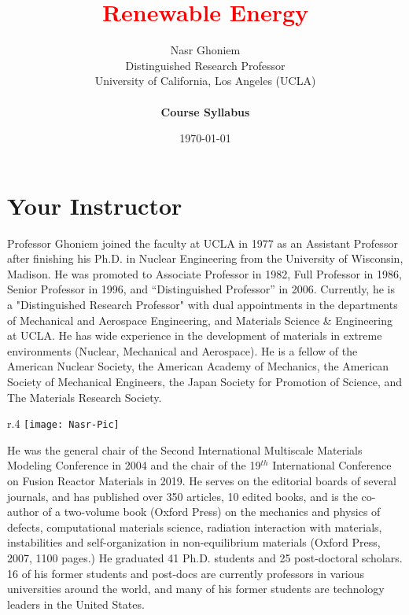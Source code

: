 \documentclass[11pt]{article}
\title{{\Huge\textcolor{red}{Renewable Energy}}}
\author{Nasr Ghoniem\\Distinguished Research Professor\\University of California, Los Angeles (UCLA)\\~ \\\textbf{Course Syllabus}}
\date{\today}
\begin{document}
\maketitle
\tableofcontents
\newpage
\section{Your Instructor}
Professor Ghoniem joined the faculty at UCLA in 1977 as an Assistant Professor after finishing his
Ph.D. in Nuclear Engineering from the University of Wisconsin, Madison. He was promoted to
Associate Professor in 1982, Full Professor in 1986, Senior Professor in 1996, and “Distinguished
Professor” in 2006. Currently, he is a "Distinguished Research Professor" with dual appointments in the departments of Mechanical and Aerospace Engineering, and Materials Science \& Engineering at UCLA. He has wide experience in the development of materials in extreme environments (Nuclear, Mechanical and Aerospace). He is a fellow of the American Nuclear Society, the American Academy of Mechanics, the American Society of Mechanical Engineers, the Japan Society for Promotion of Science, and The Materials Research Society.
\begin{wrapfigure}{r}{.4\textwidth}
	\texttt{[image: Nasr-Pic]}
\end{wrapfigure}

He was the general chair of the Second International Multiscale Materials Modeling Conference in 2004 and the chair of the 19$^{th}$ International Conference on Fusion Reactor Materials in 2019.  He serves on the editorial boards of several journals, and has published over 350 articles, 10 edited books, and is the co-author of a two-volume book (Oxford Press) on the mechanics and physics of defects, computational materials science, radiation interaction with materials, instabilities and self-organization in non-equilibrium materials (Oxford  Press, 2007, 1100 pages.)  He graduated 41 Ph.D. students and 25 post-doctoral scholars. 16 of his former students and post-docs are currently professors in various universities around the world, and many of his former students are technology leaders in the United States. 
\end{document}
